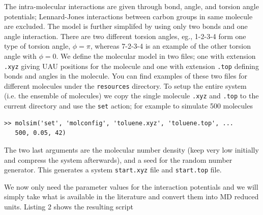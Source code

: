 \documentclass[11pt]{article}
\begin{document}
The intra-molecular interactions are given through bond, angle, and torsion
angle potentials; Lennard-Jones interactions between carbon groups in same
molecule are excluded. The model is further simplifed by using only two bonds
and one angle interaction. There are two different torsion angles, eg., 1-2-3-4
form one type of torsion angle, $\phi=\pi$, whereas 7-2-3-4 is an example of the
other torsion angle with $\phi=0$. We define the molecular model in two files;
one with extension \verb!.xyz! giving UAU positions for the molecule and one with
extension \verb!.top! defining bonds and angles in the molecule. You can find
examples of these two files for different molecules under the \verb!resources!
directory. To setup the entire system (i.e. the ensemble of molecules) we copy the
single molecule \verb!.xyz! and \verb!.top! to the current directory and use the
\verb!set! action; for example to simulate 500 molecules
\begin{verbatim}
>> molsim('set', 'molconfig', 'toluene.xyz', 'toluene.top', ... 
   500, 0.05, 42)
\end{verbatim}
The two last arguments are the molecular number density (keep very low initially
and compress the system afterwards), and a seed for the random number
generator. This generates a system \verb!start.xyz! file and \verb!start.top!
file. 

We now only need the parameter values for the interaction potentials and we will
simply take what is available in the literature and convert them into MD reduced
units. Listing 2 shows the resulting script

\bigskip
\end{document}
